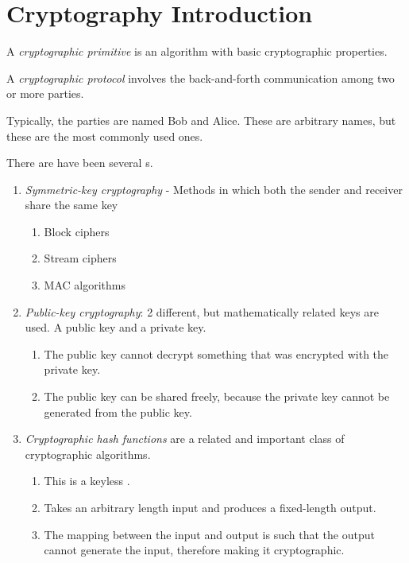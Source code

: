 \section{Cryptography Introduction}\label{sec:Intro_Cryptography}
\begin{definition}\label{def:Cryptographic_Primitive}
  A \emph{cryptographic primitive} is an algorithm with basic cryptographic properties.
\end{definition}

\begin{definition}\label{def:Cryptographic_Protocol}
  A \emph{cryptographic protocol} involves the back-and-forth communication among two or more parties.

  \begin{remark}\label{rmk:Bob_and_Alice}
    Typically, the parties are named Bob and Alice.
    These are arbitrary names, but these are the most commonly used ones.
  \end{remark}
\end{definition}

There are have been several s.
\begin{enumerate}[noitemsep]
\item \textit{Symmetric-key cryptography} - Methods in which both the sender and receiver share the same key
  \begin{enumerate}[noitemsep]
  \item Block ciphers
  \item Stream ciphers
  \item MAC algorithms
  \end{enumerate}
\item \textit{Public-key cryptography}: 2 different, but mathematically related keys are used.
  A public key and a private key.
  \begin{enumerate}[noitemsep]
  \item The public key cannot decrypt something that was encrypted with the private key.
  \item The public key can be shared freely, because the private key cannot be generated from the public key.
  \end{enumerate}
\item \textit{Cryptographic hash functions} are a related and important class of cryptographic algorithms.
  \begin{enumerate}[noitemsep]
  \item This is a keyless .
  \item Takes an arbitrary length input and produces a fixed-length output.
  \item The mapping between the input and output is such that the output cannot generate the input, therefore making it cryptographic.
  \end{enumerate}
\end{enumerate}

